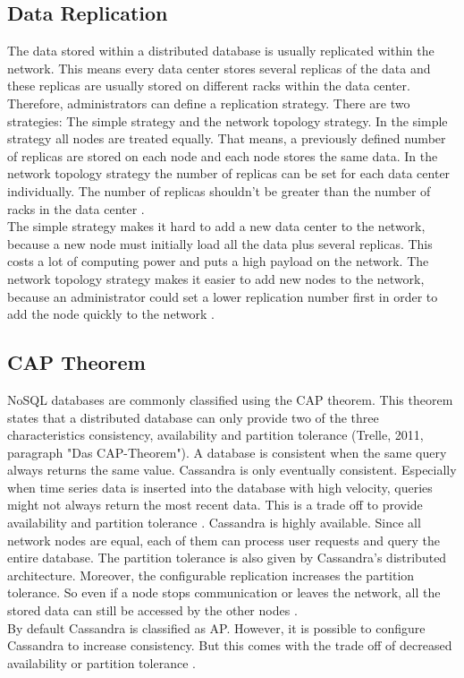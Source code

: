 \subsection{Data Replication}
The data stored within a distributed database is usually replicated within the network. This means every data center stores several replicas of the data and these replicas are usually stored on different racks within the data center. Therefore, administrators can define a replication strategy. There are two strategies: The simple strategy and the network topology strategy. In the simple strategy all nodes are treated equally. That means, a previously defined number of replicas are stored on each node and each node stores the same data. In the network topology strategy the number of replicas can be set for each data center individually. The number of replicas shouldn't be greater than the number of racks in the data center \cite{replication}. \\
The simple strategy makes it hard to add a new data center to the network, because a new node must initially load all the data plus several replicas. This costs a lot of computing power and puts a high payload on the network. The network topology strategy makes it easier to add new nodes to the network, because an administrator could set a lower replication number first in order to add the node quickly to the network \cite{replication} \cite{repApache}.

\subsection{CAP Theorem}
NoSQL databases are commonly classified using the CAP theorem. This theorem states that a distributed database can only provide two of the three characteristics consistency, availability and partition tolerance (Trelle, 2011, paragraph "Das CAP-Theorem"). A database is consistent when the same query always returns the same value. Cassandra is only eventually consistent. Especially when time series data is inserted into the database with high velocity, queries might not always return the most recent data. This is a trade off to provide availability and partition tolerance \cite{architectureOverview}. Cassandra is highly available. Since all network nodes are equal, each of them can process user requests and query the entire database. The partition tolerance is also given by Cassandra's distributed architecture. Moreover, the configurable replication increases the partition tolerance. So even if a node stops communication or leaves the network, all the stored data can still be accessed by the other nodes \cite{learningCassandra} \cite{realTimeAnal}. \\
By default Cassandra is classified as AP. However, it is possible to configure Cassandra to increase consistency. But this comes with the trade off of decreased availability or partition tolerance \cite{learningCassandra}.

